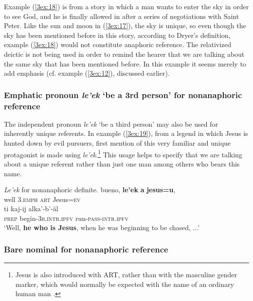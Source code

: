 \documentclass[output=paper]{langsci/langscibook}
\begin{document}
Example (\ref{3ex:18}) is from a story in which a man wants to enter the sky in order to see God, and he is finally allowed in after a series of negotiations with Saint Peter.  Like the sun and moon in (\ref{3ex:17}), the sky is unique, so even though the sky has been mentioned before in this story, according to Dryer's definition, example (\ref{3ex:18}) would not constitute anaphoric reference.  The relativized deictic is not being used in order to remind the hearer that we are talking about the same sky that has been mentioned before.  In this example it seems merely to add emphasis (cf. example (\ref{3ex:12}), discussed earlier).


\subsubsection{Emphatic pronoun {\emph{le'ek}} `be a 3rd person' for nonanaphoric reference}\label{3sec:323}

The independent pronoun {\emph{le'ek}} `be a third person' may also be used for inherently unique referents. In example (\ref{3ex:19}), from a legend in which Jesus is hunted down by evil pursuers, first mention of this very familiar and unique protagonist is made using {\emph{le'ek}}.\footnote{{Jesus is also introduced with ART, rather than with the masculine gender marker, which would normally be expected with the name of an ordinary human man \citep{contini:morava:danziger:18}.}} This usage helps to specify that we are talking about a unique referent rather than just one man among others who bears this name.

\begin{exe}
\ex\label{3ex:19}
{\emph{Le'ek}} for nonanaphoric definite. 
\exi{}
\gll	bueno, 	{\textbf{le'ek}} 	{\textbf{a}}	{\textbf{jesus=u}},  \\
	well		{\textsc{3.emph}}	{\textsc{art}}	Jesus={\textsc{ev}} \\
\glt	
\exi{}
\gll	ti 			kaj-ij 					alka'-b'-\"al \\
	{\textsc{prep}}		begin-{\textsc{3b.intr.ipfv}}	run-{\textsc{pass-intr.ipfv}} \\
\glt	`Well, {\textbf{he who is Jesus}}, when he was beginning to be chased, ...'
\end{exe}

\subsubsection{Bare nominal for nonanaphoric reference}\label{3sec:324}
\end{document}
